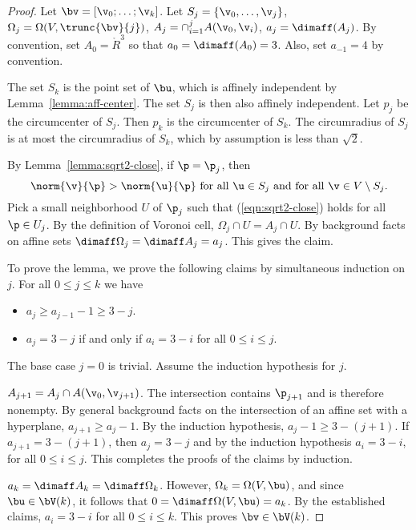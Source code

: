 \begin{proof} 
Let $\bv = [\v_0;\ldots;\v_k]$.  
Let $S_j = \{\v_0,\ldots,\v_j\}$,  
$\Omega_j = \Omega(V,\trunc{\bv}{j})$, 
$A_j=\cap_{i=1}^j A(\v_0,\v_i)$, $a_j = \dimaff(A_j)$.
By convention, set $A_0 = \ring{R}^3$ so that $a_0=\dimaff(A_0) = 3$.
Also, set $a_{-1} = 4$ by convention.

The set $S_k$ is the point set of $\bu$, which is affinely independent
by Lemma~\ref{lemma:aff-center}.  The set $S_j$ is then also affinely
independent.  Let $p_j$ be the circumcenter of $S_j$.  Then $p_k$ is
the circumcenter of $S_k$.  The circumradius of $S_j$ is at most the
circumradius of $S_k$, which by assumption is less than $\sqrt2$.

By Lemma~\ref{lemma:sqrt2-close}, if $\p=\p_j$, then
\begin{equation}\label{eqn:sqrt2-close} 
\norm{\v}{\p} > \norm{\u}{\p}\text{ for all }\u\in S_j
\text{ and for all }\v\in V\setminus S_j.
\end{equation}   
Pick a small neighborhood $U$ of $\p_j$ such that (\ref{eqn:sqrt2-close}) holds
for all $\p\in U_j$.  By the definition of Voronoi cell, $\Omega_j \cap U=A_j\cap U$.
By background facts on affine sets $\dimaff\Omega_j = \dimaff A_j=a_j$.  This gives
the claim.

To prove the lemma, we prove the following claims by simultaneous induction on $j$.
For all $0\le j\le k$ we have
\begin{itemize} 
\item $a_j \ge a_{j-1} - 1\ge 3-j$.
\item $a_j = 3-j$ if and only if $a_i=3-i$ for all $0\le i\le j$.
\end{itemize}
The base case $j=0$ is trivial.  Assume the induction hypothesis for $j$.

$A_{j+1} = A_{j}\cap A(\v_0,\v_{j+1})$.  The intersection contains $\p_{j+1}$ and is therefore
nonempty.  By general background facts on the intersection of an
affine set with a hyperplane, $a_{j+1} \ge a_{j}-1$.  By the induction hypothesis,
$a_{j}-1\ge 3-(j+1)$.
If $a_{j+1}=3-(j+1)$, then $a_{j}=3-j$ and by the induction hypothesis
$a_{i}=3-i$, for all $0\le i\le j$. This completes the proofs of the claims by induction.

$a_k = \dimaff A_k=\dimaff \Omega_k$.  However, $\Omega_k=
\Omega(V,\bu)$, and since $\bu\in \bV(k)$, it follows that $0=\dimaff\Omega(V,\bu)=a_k$.
By the established claims, $a_i = 3-i$ for all $0\le i\le k$.  This proves $\bv\in\bV(k)$.


\end{proof}

